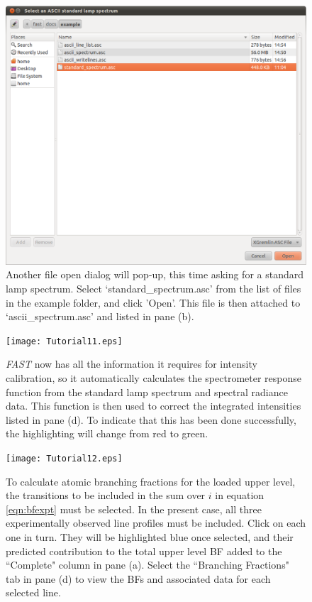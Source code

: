 \documentclass[a4paper,12pt]{report}
\newcommand{\fast}{\emph{FAST} }
\begin{document}
\begin{figure}\centering
\includegraphics[width=140mm]{Tutorial10.eps}
\caption{Another file open dialog will pop-up, this time asking for a standard lamp spectrum. Select `standard\_spectrum.asc' from the list of files in the example folder, and click 'Open'. This file is then attached to `ascii\_spectrum.asc' and listed in pane (b).}
\label{fig:tut10}
\end{figure}

\begin{figure}\centering
\texttt{[image: Tutorial11.eps]}
\caption{\fast now has all the information it requires for intensity calibration, so it automatically calculates the spectrometer response function from the standard lamp spectrum and spectral radiance data. This function is then used to correct the integrated intensities listed in pane (d). To indicate that this has been done successfully, the highlighting will change from red to green.}
\label{fig:tut11}
\end{figure}

\begin{figure}\centering
\texttt{[image: Tutorial12.eps]}
\caption{To calculate atomic branching fractions for the loaded upper level, the transitions to be included in the sum over $i$ in equation \ref{eqn:bfexpt} must be selected. In the present case, all three experimentally observed line profiles must be included. Click on each one in turn. They will be highlighted blue once selected, and their predicted contribution to the total upper level BF added to the ``Complete" column in pane (a). Select the ``Branching Fractions" tab in pane (d) to view the BFs and associated data for each selected line.}
\label{fig:tut12}
\end{figure}
\end{document}
